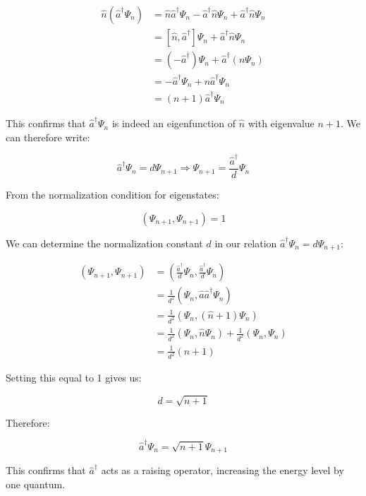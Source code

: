 \documentclass[italian]{HKNdocument}
\begin{document}
\begin{align}
\hat{n}(\hat{a}^\dagger\Psi_n) &= \hat{n}\hat{a}^\dagger\Psi_n - \hat{a}^\dagger\hat{n}\Psi_n + \hat{a}^\dagger\hat{n}\Psi_n \\
&= [\hat{n}, \hat{a}^\dagger]\Psi_n + \hat{a}^\dagger\hat{n}\Psi_n \\
&= (-\hat{a}^\dagger)\Psi_n + \hat{a}^\dagger(n\Psi_n)  \\
&= -\hat{a}^\dagger\Psi_n + n\hat{a}^\dagger\Psi_n \\
&= (n+1)\hat{a}^\dagger\Psi_n
\end{align}

This confirms that $\hat{a}^\dagger\Psi_n$ is indeed an eigenfunction of $\hat{n}$ with eigenvalue $n+1$. We can therefore write:

\begin{equation}
\hat{a}^\dagger\Psi_n = d\Psi_{n+1} \Longrightarrow \Psi_{n+1} = \frac{\hat{a}^\dagger}{d}\Psi_n
\end{equation}


From the normalization condition for eigenstates:

\begin{equation}
(\Psi_{n+1}, \Psi_{n+1}) = 1
\end{equation}

We can determine the normalization constant $d$ in our relation $\hat{a}^\dagger\Psi_n = d\Psi_{n+1}$:

\begin{align}
(\Psi_{n+1}, \Psi_{n+1}) &= \left(\frac{\hat{a}^\dagger}{d}\Psi_n, \frac{\hat{a}^\dagger}{d}\Psi_n\right) \\
&= \frac{1}{d^2}(\Psi_n, \hat{a}\hat{a}^\dagger\Psi_n) \\
&= \frac{1}{d^2}(\Psi_n, (\hat{n}+1)\Psi_n)  \\
&= \frac{1}{d^2}(\Psi_n, \hat{n}\Psi_n) + \frac{1}{d^2}(\Psi_n, \Psi_n) \\
&= \frac{1}{d^2}(n+1)
\end{align}

Setting this equal to 1 gives us:

\begin{equation}
d = \sqrt{n+1}
\end{equation}

Therefore:

\begin{equation}
\hat{a}^\dagger\Psi_n = \sqrt{n+1}\Psi_{n+1}
\end{equation}

This confirms that $\hat{a}^\dagger$ acts as a raising operator, increasing the energy level by one quantum.
\end{document}
